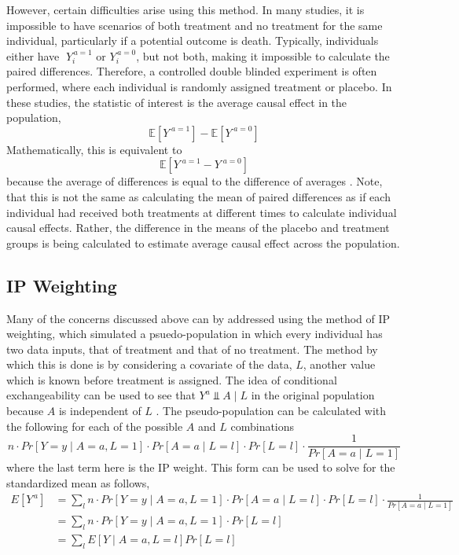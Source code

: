 However, certain difficulties arise using this method.  In many studies, it is impossible to have scenarios of both treatment and no treatment for the same individual, particularly if a potential outcome is death.  Typically, individuals either have $\; Y_i^{\, a=1}$ or  $Y_i^{\, a=0}$, but not both, making it impossible to calculate the paired differences.  Therefore, a controlled double blinded experiment is often performed, where each individual is randomly assigned treatment or placebo.  In these studies, the statistic of interest is the average causal effect in the population, 
$$ \mathbb{E}[Y^{\; a=1}] - \mathbb{E}[Y^{\; a=0}]$$ 
Mathematically, this is equivalent to 
$$ \mathbb{E}[Y^{\; a=1} - Y^{\; a=0}]$$ 
because the average of differences is equal to the difference of averages \cite{hernan_robins_2016}.  Note, that this is not the same as calculating the mean of paired differences as if each individual had received both treatments at different times to calculate individual causal effects.  Rather, the difference in the means of the placebo and treatment groups is being calculated to estimate average causal effect across the population.  

\subsection{IP Weighting} 
Many of the concerns discussed above can by addressed using the method of IP weighting, which simulated a psuedo-population in which every individual has two data inputs, that of treatment and that of no treatment.  The method by which this is done is by considering a covariate of the data, $L$, another value which is known before treatment is assigned.  The idea of conditional exchangeability can be used to see that $Y^{a} \Perp A\mid L$ in the original population because $A$ is independent of $L$ \cite{hernan_robins_2016}.  The pseudo-population can be calculated with the following for each of the possible $A$ and $L$ combinations 
$$ n\cdot Pr[Y=y \mid A = a, L= 1] \cdot Pr[A=a \mid L=l]  \cdot Pr[L=l] \cdot \frac{1}{Pr[A = a \mid L = 1]} $$ 
where the last term here is the IP weight.  This form can be used to solve for the standardized mean as follows, 
\begin{align} 
E[Y^{\,a}] &= \sum_l n \cdot Pr[Y=y \mid A = a, L= 1] \cdot Pr[A=a \mid L=l]  \cdot Pr[L=l] \cdot \frac{1}{Pr[A = a \mid L = 1]} \\ 
&=  \sum_l n \cdot Pr[Y=y \mid A = a, L= 1] \cdot Pr[L=l]\\ 
&= \sum_l E[Y \mid A=a, L= l] Pr[L=l] 
\end{align} 


